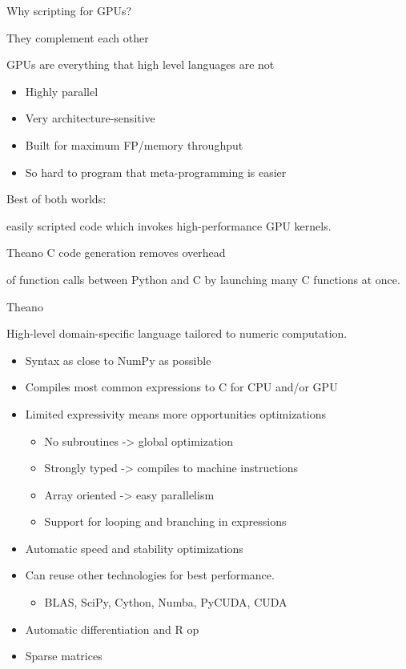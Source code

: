 \documentclass[utf8x,xcolor=pdftex,dvipsnames,table]{beamer}
\begin{document}
\begin{frame}{Why scripting for GPUs?}
  \begin{bf}They complement each other\end{bf}

  GPUs are everything that high level languages are not

  \begin{itemize}
    \item Highly parallel
    \item Very architecture-sensitive
    \item Built for maximum FP/memory throughput
    \item So hard to program that meta-programming is easier
  \end{itemize}

  \begin{bf}Best of both worlds:\end{bf} easily scripted code which invokes high-performance GPU kernels.

  \begin{bf}Theano C code generation removes overhead\end{bf} of
  function calls between Python and C by launching many C functions at once.

\end{frame}

\begin{frame}{Theano}

  High-level domain-specific language tailored to numeric computation.

  \begin{itemize}
    \item Syntax as close to NumPy as possible
    \item Compiles most common expressions to C for CPU and/or GPU
    \item Limited expressivity means more opportunities optimizations
    \begin{itemize}
      \item No subroutines -> global optimization
      \item Strongly typed -> compiles to machine instructions
      \item Array oriented -> easy parallelism
      \item Support for looping and branching in expressions
    \end{itemize}
    \item Automatic speed and stability optimizations
    \item Can reuse other technologies for best performance.
    \begin{itemize}
      \item BLAS, SciPy, Cython, Numba, PyCUDA, CUDA
    \end{itemize}
    \item Automatic differentiation and R op
    \item Sparse matrices
  \end{itemize}
\end{frame}
\end{document}
